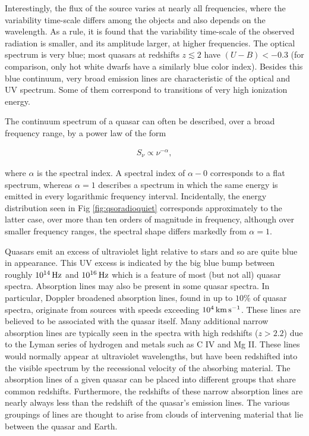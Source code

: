\documentclass[a4paper,10pt]{article}
\begin{document}
{\noindent}Interestingly, the flux of the source varies at nearly all frequencies, where the variability time-scale differs among the objects and also depends on the wavelength. As a rule, it is found that the variability time-scale of the observed radiation is smaller, and its amplitude larger, at higher frequencies. The optical spectrum is very blue; most quasars at redshifts $z\lesssim2$ have $(U-B)<-0.3$ (for comparison, only hot white dwarfs have a similarly blue color index). Besides this blue continuum, very broad emission lines are characteristic of the optical and UV spectrum. Some of them correspond to transitions of very high ionization energy.

{\noindent}The continuum spectrum of a quasar can often be described, over a broad frequency range, by a power law of the form

\begin{align*}
    S_\nu \propto \nu^{-\alpha},
\end{align*}

{\noindent}where $\alpha$ is the spectral index. A spectral index of $\alpha-0$ corresponds to a flat spectrum, whereas $\alpha=1$ describes a spectrum in which the same energy is emitted in every logarithmic frequency interval. Incidentally, the energy distribution seen in Fig \ref{fig:qsoradioquiet} corresponds approximately to the latter case, over more than ten orders of magnitude in frequency, although over smaller frequency ranges, the spectral shape differs markedly from $\alpha=1$.

{\noindent}Quasars emit an excess of ultraviolet light relative to stars and so are quite blue in appearance. This UV excess is indicated by the big blue bump between roughly $10^{14}\,{\rm Hz}$ and $10^{16}\,{\rm Hz}$ which is a feature of most (but not all) quasar spectra. Absorption lines may also be present in some quasar spectra. In particular, Doppler broadened absorption lines, found in up to $10\%$ of quasar spectra, originate from sources with speeds exceeding $10^4\,{\rm km\,s^{-1}}$. These lines are believed to be associated with the quasar itself. Many additional narrow absorption lines are typically seen in the spectra with high redshifts ($z>2.2$) due to the Lyman series of hydrogen and metals such as C IV and Mg II. These lines would normally appear at ultraviolet wavelengths, but have been redshifted into the visible spectrum by the recessional velocity of the absorbing material. The absorption lines of a given quasar can be placed into different groups that share common redshifts. Furthermore, the redshifts of these narrow absorption lines are nearly always less than the redshift of the quasar's emission lines. The various groupings of lines are thought to arise from clouds of intervening material that lie between the quasar and Earth.
\end{document}
